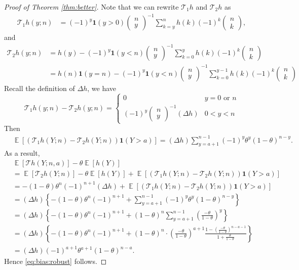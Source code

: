 \documentclass[12pt,letterpaper]{article}
\newcommand{\com}[2]{
  \left(\begin{array}{cc}
    #1 \\ #2
  \end{array}\right)
}
\newcommand{\lb}{\left(}
\newcommand{\rb}{\right)}
\newcommand{\E}{\operatorname{\mathbb{E}}}
\newcommand{\T}{\mathcal{T}}
\begin{document}
\begin{proof}[Proof of Theorem \ref{thm:better}]
Note that we can rewrite $\T_1 h$ and $\T_2 h$ as
\begin{align*}
  \T_1 h(y; n) &= (-1)^y \mathbf{1}(y > 0)\com{n}{y}^{-1}\sum_{k=y}^{n}h(k)(-1)^{k}\com{n}{k},
\end{align*}
and
\begin{align*}
  \T_2 h(y; n) &= h(y) - (-1)^y \mathbf{1}(y < n)\com{n}{y}^{-1}\sum_{k=0}^{y}h(k)(-1)^{k}\com{n}{k}\\
  & = h(n)\mathbf{1}(y = n) - (-1)^y \mathbf{1}(y < n)\com{n}{y}^{-1}\sum_{k=0}^{y-1}h(k)(-1)^{k}\com{n}{k}
\end{align*}
Recall the definition of $\Delta h$, we have
\[\T_1 h(y; n) - \T_2 h(y; n) = \left\{
    \begin{array}{ll}
      0 & y = 0 \text{ or }n\\
      (-1)^y \com{n}{y}^{-1} (\Delta h)& 0 < y < n
    \end{array}
  \right.\]
Then
\begin{align*}
  &\E[(\T_1 h(Y; n) - \T_2 h(Y; n))\mathbf{1}(Y > a)] = (\Delta h)\sum_{y=a+1}^{n-1} (-1)^y \theta^y (1 - \theta)^{n-y}.
\end{align*}
As a result, 
\begin{align*}
  &\E[\T h(Y; n, a)] - \theta \E[h(Y)]\\
  & = \E[\T_2 h(Y; n)] - \theta \E[h(Y)] + \E[(\T_1 h(Y; n) - \T_2 h(Y; n))\mathbf{1}(Y > a)]\\
  & = - (1 - \theta) \theta^{n}(-1)^{n+1}(\Delta h) + \E[(\T_1 h(Y; n) - \T_2 h(Y; n))\mathbf{1}(Y > a)]\\
  & = (\Delta h)\left\{- (1 - \theta) \theta^{n}(-1)^{n+1} + \sum_{y=a+1}^{n-1} (-1)^y \theta^y (1 - \theta)^{n-y}\right\}\\
  & = (\Delta h)\left\{- (1 - \theta) \theta^{n}(-1)^{n+1} + (1 - \theta)^{n}\sum_{y=a+1}^{n-1} \lb \frac{-\theta}{1-\theta}\rb^{y}\right\}\\
  & = (\Delta h)\left\{- (1 - \theta) \theta^{n}(-1)^{n+1} + (1 - \theta)^{n}\cdot \lb \frac{-\theta}{1-\theta}\rb^{a+1} \frac{1 - \lb \frac{-\theta}{1-\theta}\rb^{n-a-1}}{1 + \frac{\theta}{1- \theta}}\right\}\\
  & = (\Delta h)(-1)^{a+1}\theta^{a+1} (1 - \theta)^{n-a}.
\end{align*}
Hence \eqref{eq:bias:robust} follows. 


\end{proof}
\end{document}
